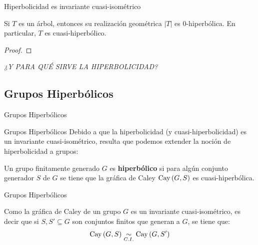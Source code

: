 \documentclass[xcolor=dvipsnames]{beamer}
\theoremstyle{largebreak}
\newcommand\abs[1]{\ensuremath{\left|#1\right|}}
\newcommand{\Cay}[1]{\ensuremath{\textup{Cay}\left(#1\right)}}
\newcommand{\qisom}{\ensuremath{\underset{C.I.}{\sim}}}
\begin{document}
\begin{frame}{Hiperbolicidad es invariante cuasi-isométrico}
    \begin{propo}
        Si $T$ es un árbol, entonces su realización geométrica $\abs{T}$ es $0$-hiperbólica. En particular, $T$ es cuasi-hiperbólico.
    \end{propo}

    \begin{proof}
        
    \end{proof}
\end{frame}

\begin{frame}
    \begin{center}
        \textit{¿Y PARA QUÉ SIRVE LA HIPERBOLICIDAD?}
    \end{center}
\end{frame}

\subsection{Grupos Hiperbólicos}

\begin{frame}
    \begin{center}
        Grupos Hiperbólicos
    \end{center}
\end{frame}

\begin{frame}{Grupos Hiperbólicos}
    Debido a que la hiperbolicidad (y cuasi-hiperbolicidad) es un invariante cuasi-isométrico, resulta que podemos extender la noción de hiperbolicidad a grupos:

    \begin{mydef}
        Un grupo finitamente generado $G$ es \textbf{hiperbólico} si para algún conjunto generador $S$ de $G$ se tiene que la gráfica de Caley $\Cay{G,S}$ es cuasi-hiperbólica.
    \end{mydef}
\end{frame}

\begin{frame}{Grupos Hiperbólicos}
    \begin{obs}
        Como la gráfica de Caley de un grupo $G$ es un invariante cuasi-isométrico, es decir que si $S,S'\subseteq G$ son conjuntos finitos que generan a $G$, se tiene que:
        \begin{equation*}
            \Cay{G,S}\qisom\Cay{G,S'}
        \end{equation*}
    \end{obs}
\end{frame}
\end{document}
